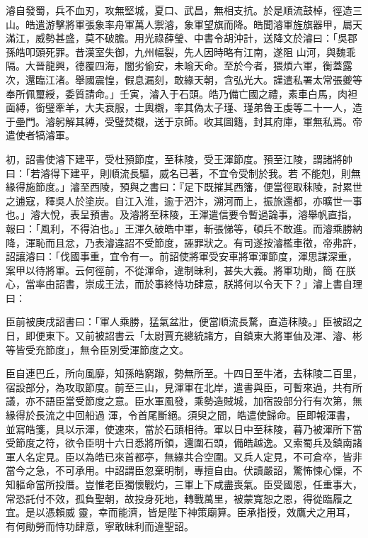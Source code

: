 \begin{pinyinscope}
 濬自發蜀，兵不血刃，攻無堅城，夏口、武昌，無相支抗。於是順流鼓棹，徑造三山。皓遣游擊將軍張象率舟軍萬人禦濬，象軍望旗而降。皓聞濬軍旌旗器甲，屬天滿江，威勢甚盛，莫不破膽。用光祿薛瑩、中書令胡沖計，送降文於濬曰：「吳郡孫皓叩頭死罪。昔漢室失御，九州幅裂，先人因時略有江南，遂阻
 山河，與魏乖隔。大晉龍興，德覆四海，闇劣偷安，未喻天命。至於今者，猥煩六軍，衡蓋露次，還臨江渚。舉國震惶，假息漏刻，敢緣天朝，含弘光大。謹遣私署太常張夔等奉所佩璽綬，委質請命。」壬寅，濬入于石頭。皓乃備亡國之禮，素車白馬，肉袒面縛，銜璧牽羊，大夫衰服，士輿櫬，率其偽太子瑾、瑾弟魯王虔等二十一人，造于壘門。濬躬解其縛，受璧焚櫬，送于京師。收其圖籍，封其府庫，軍無私焉。帝遣使者犒濬軍。



 初，詔書使濬下建平，受杜預節度，至秣陵，受王渾節度。預至江陵，謂諸將帥曰：「若濬得下建平，則順流長驅，威名已著，不宜令受制於我。若
 不能剋，則無緣得施節度。」濬至西陵，預與之書曰：『足下既摧其西籓，便當徑取秣陵，討累世之逋寇，釋吳人於塗炭。自江入淮，逾于泗汴，溯河而上，振旅還都，亦曠世一事也。」濬大悅，表呈預書。及濬將至秣陵，王渾遣信要令暫過論事，濬舉帆直指，報曰：「風利，不得泊也。」王渾久破皓中軍，斬張悌等，頓兵不敢進。而濬乘勝納降，渾恥而且忿，乃表濬違詔不受節度，誣罪狀之。有司遂按濬檻車徵，帝弗許，詔讓濬曰：「伐國事重，宜令有一。前詔使將軍受安車將軍渾節度，渾思謀深重，案甲以待將軍。云何徑前，不從渾命，違制昧利，甚失大義。將軍功勛，簡
 在朕心，當率由詔書，崇成王法，而於事終恃功肆意，朕將何以令天下？」濬上書自理曰：



 臣前被庚戌詔書曰：「軍人乘勝，猛氣盆壯，便當順流長騖，直造秣陵。」臣被詔之日，即便東下。又前被詔書云「太尉賈充總統諸方，自鎮東大將軍伷及渾、濬、彬等皆受充節度」，無令臣別受渾節度之文。



 臣自連巴丘，所向風靡，知孫皓窮踧，勢無所至。十四日至牛渚，去秣陵二百里，宿設部分，為攻取節度。前至三山，見渾軍在北岸，遣書與臣，可暫來過，共有所議，亦不語臣當受節度之意。臣水軍風發，乘勢造賊城，加宿設部分行有次第，無緣得於長流之中回船過
 渾，令首尾斷絕。須臾之間，皓遣使歸命。臣即報渾書，並寫皓箋，具以示渾，使速來，當於石頭相待。軍以日中至秣陵，暮乃被渾所下當受節度之符，欲令臣明十六日悉將所領，還圍石頭，備皓越逸。又索蜀兵及鎮南諸軍人名定見。臣以為皓已來首都亭，無緣共合空圍。又兵人定見，不可倉卒，皆非當今之急，不可承用。中詔謂臣忽棄明制，專擅自由。伏讀嚴詔，驚怖悚心慄，不知軀命當所投厝。豈惟老臣獨懷戰灼，三軍上下咸盡喪氣。臣受國恩，任重事大，常恐託付不效，孤負聖朝，故投身死地，轉戰萬里，被蒙寬恕之恩，得從臨履之宜。是以憑賴威
 靈，幸而能濟，皆是陛下神策廟算。臣承指授，效鷹犬之用耳，有何勛勞而恃功肆意，寧敢昧利而違聖詔。




\end{pinyinscope}
